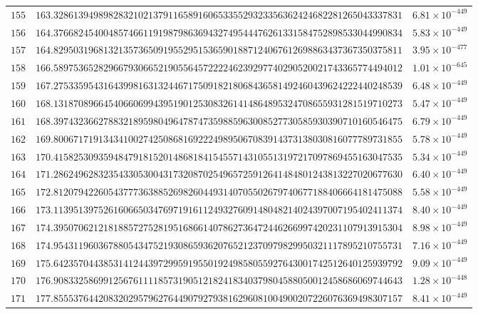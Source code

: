 \documentclass[12pt,reqno]{amsart}
\theoremstyle{remark}
\begin{document}
\begin{longtable}{clc}
$155$ & $163.3286139498982832102137911658916065335529323356362424682281265043337831$ & $6.81\times 10^{-449}$ \\
$156$ & $164.3766824540048574661191987986369432749544476261331584752898533044990834$ & $5.83\times 10^{-449}$ \\
$157$ & $164.8295031968132135736509195529515365901887124067612698863437367350375811$ & $3.95\times 10^{-477}$ \\
$158$ & $166.5897536528296679306652190556457222246239297740290520021743365774494012$ & $1.01\times 10^{-645}$ \\
$159$ & $167.2753359543164399816313244671750918218068436581492460439624222440248539$ & $6.48\times 10^{-449}$ \\
$160$ & $168.1318708966454066069943951901253083261414864895324708655931281519710273$ & $5.47\times 10^{-449}$ \\
$161$ & $168.3974323662788321895980496478747359885963008527730585930390710160546475$ & $6.79\times 10^{-449}$ \\
$162$ & $169.8006717191343410027425086816922249895067083914373138030816077789731855$ & $5.78\times 10^{-449}$ \\
$163$ & $170.4158253093594847918152014868184154557143105513197217097869455163047535$ & $5.34\times 10^{-449}$ \\
$164$ & $171.2862496283235433053004317320870254965725912641484801243813227020677630$ & $6.40\times 10^{-449}$ \\
$165$ & $172.8120794226054377736388526982604493140705502679740677188406664181475088$ & $5.58\times 10^{-449}$ \\
$166$ & $173.1139513975261606650347697191611249327609148048214024397007195402411374$ & $8.40\times 10^{-449}$ \\
$167$ & $174.3950706212181885727528195168661407862736472446266997420231107913915304$ & $8.98\times 10^{-449}$ \\
$168$ & $174.9543119603678805434752193086593620765212370979829950321117895210755731$ & $7.16\times 10^{-449}$ \\
$169$ & $175.6423570443853141244397299591955019249858055927643001742512640125939792$ & $9.09\times 10^{-449}$ \\
$170$ & $176.9083325869912567611118573190512182418340379804588050012458686069744643$ & $1.28\times 10^{-448}$ \\
$171$ & $177.8555376442083202957962764490792793816296081004900207226076369498307157$ & $8.41\times 10^{-449}$ \\

\end{longtable}
\end{document}
